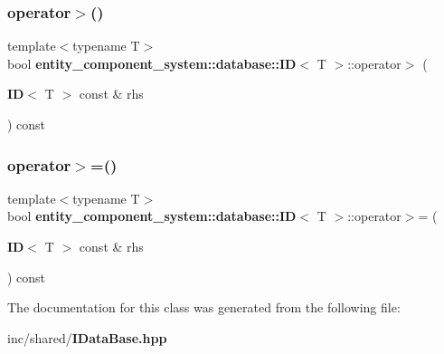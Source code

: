 \subsubsection{operator$>$()}
{\footnotesize\ttfamily template$<$typename T$>$ \\
bool {\bf entity\+\_\+component\+\_\+system\+::database\+::\+ID}$<$ T $>$\+::operator$>$ (\begin{DoxyParamCaption}\item[{{\bf ID}$<$ T $>$ const \&}]{rhs }\end{DoxyParamCaption}) const\hspace{0.3cm}{\ttfamily [inline]}}

\label{classentity__component__system_1_1database_1_1_i_d_a18013373a4e7fe43ba7cb1e561731495} 
\subsubsection{operator$>$=()}
{\footnotesize\ttfamily template$<$typename T$>$ \\
bool {\bf entity\+\_\+component\+\_\+system\+::database\+::\+ID}$<$ T $>$\+::operator$>$= (\begin{DoxyParamCaption}\item[{{\bf ID}$<$ T $>$ const \&}]{rhs }\end{DoxyParamCaption}) const\hspace{0.3cm}{\ttfamily [inline]}}



The documentation for this class was generated from the following file\+:\begin{DoxyCompactItemize}
\item 
inc/shared/{\bf I\+Data\+Base.\+hpp}\end{DoxyCompactItemize}
